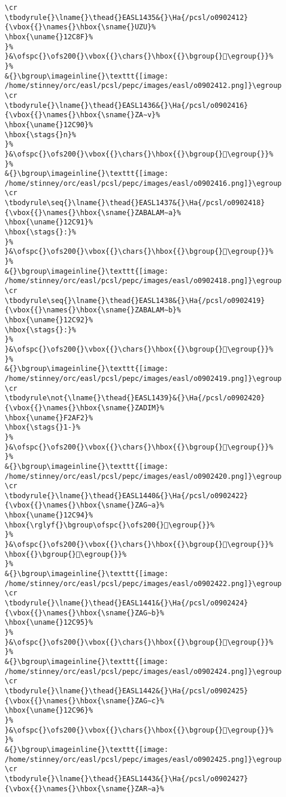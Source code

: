 \begin{verbatim}
\cr
\tbodyrule{}\lname{}\thead{}EASL1435&{}\Ha{/pcsl/o0902412}{\vbox{{}\names{}\hbox{\sname{}UZU}%
\hbox{\uname{}12C8F}%
}%
}&\ofspc{}\ofs200{}\vbox{{}\chars{}\hbox{{}\bgroup{}𒲏\egroup{}}%
}%
&{}\bgroup\imageinline{}\texttt{[image: /home/stinney/orc/easl/pcsl/pepc/images/easl/o0902412.png]}\egroup
\cr
\tbodyrule{}\lname{}\thead{}EASL1436&{}\Ha{/pcsl/o0902416}{\vbox{{}\names{}\hbox{\sname{}ZA∼v}%
\hbox{\uname{}12C90}%
\hbox{\stags{}n}%
}%
}&\ofspc{}\ofs200{}\vbox{{}\chars{}\hbox{{}\bgroup{}𒲐\egroup{}}%
}%
&{}\bgroup\imageinline{}\texttt{[image: /home/stinney/orc/easl/pcsl/pepc/images/easl/o0902416.png]}\egroup
\cr
\tbodyrule\seq{}\lname{}\thead{}EASL1437&{}\Ha{/pcsl/o0902418}{\vbox{{}\names{}\hbox{\sname{}ZABALAM∼a}%
\hbox{\uname{}12C91}%
\hbox{\stags{}:}%
}%
}&\ofspc{}\ofs200{}\vbox{{}\chars{}\hbox{{}\bgroup{}𒲑\egroup{}}%
}%
&{}\bgroup\imageinline{}\texttt{[image: /home/stinney/orc/easl/pcsl/pepc/images/easl/o0902418.png]}\egroup
\cr
\tbodyrule\seq{}\lname{}\thead{}EASL1438&{}\Ha{/pcsl/o0902419}{\vbox{{}\names{}\hbox{\sname{}ZABALAM∼b}%
\hbox{\uname{}12C92}%
\hbox{\stags{}:}%
}%
}&\ofspc{}\ofs200{}\vbox{{}\chars{}\hbox{{}\bgroup{}𒲒\egroup{}}%
}%
&{}\bgroup\imageinline{}\texttt{[image: /home/stinney/orc/easl/pcsl/pepc/images/easl/o0902419.png]}\egroup
\cr
\tbodyrule\not{\lname{}\thead{}EASL1439}&{}\Ha{/pcsl/o0902420}{\vbox{{}\names{}\hbox{\sname{}ZADIM}%
\hbox{\uname{}F2AF2}%
\hbox{\stags{}1-}%
}%
}&\ofspc{}\ofs200{}\vbox{{}\chars{}\hbox{{}\bgroup{}󲫲\egroup{}}%
}%
&{}\bgroup\imageinline{}\texttt{[image: /home/stinney/orc/easl/pcsl/pepc/images/easl/o0902420.png]}\egroup
\cr
\tbodyrule{}\lname{}\thead{}EASL1440&{}\Ha{/pcsl/o0902422}{\vbox{{}\names{}\hbox{\sname{}ZAG∼a}%
\hbox{\uname{}12C94}%
\hbox{\rglyf{}\bgroup\ofspc{}\ofs200{}𒲔\egroup{}}%
}%
}&\ofspc{}\ofs200{}\vbox{{}\chars{}\hbox{{}\bgroup{}𒲓\egroup{}}%
\hbox{{}\bgroup{}𒲔\egroup{}}%
}%
&{}\bgroup\imageinline{}\texttt{[image: /home/stinney/orc/easl/pcsl/pepc/images/easl/o0902422.png]}\egroup
\cr
\tbodyrule{}\lname{}\thead{}EASL1441&{}\Ha{/pcsl/o0902424}{\vbox{{}\names{}\hbox{\sname{}ZAG∼b}%
\hbox{\uname{}12C95}%
}%
}&\ofspc{}\ofs200{}\vbox{{}\chars{}\hbox{{}\bgroup{}𒲕\egroup{}}%
}%
&{}\bgroup\imageinline{}\texttt{[image: /home/stinney/orc/easl/pcsl/pepc/images/easl/o0902424.png]}\egroup
\cr
\tbodyrule{}\lname{}\thead{}EASL1442&{}\Ha{/pcsl/o0902425}{\vbox{{}\names{}\hbox{\sname{}ZAG∼c}%
\hbox{\uname{}12C96}%
}%
}&\ofspc{}\ofs200{}\vbox{{}\chars{}\hbox{{}\bgroup{}𒲖\egroup{}}%
}%
&{}\bgroup\imageinline{}\texttt{[image: /home/stinney/orc/easl/pcsl/pepc/images/easl/o0902425.png]}\egroup
\cr
\tbodyrule{}\lname{}\thead{}EASL1443&{}\Ha{/pcsl/o0902427}{\vbox{{}\names{}\hbox{\sname{}ZAR∼a}%

\end{verbatim}
